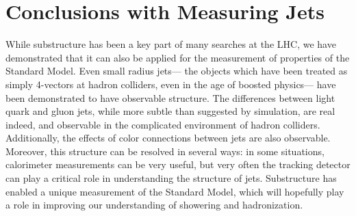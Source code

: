 


\section{Conclusions with Measuring Jets}

While substructure has been a key part of many searches at the LHC, we have demonstrated that it can also be applied for the measurement of properties of the Standard Model. Even small radius jets--- the objects which have been treated as simply 4-vectors at hadron colliders, even in the age of boosted physics--- have been demonstrated to have observable structure. The differences between light quark and gluon jets, while more subtle than suggested by simulation, are real indeed, and observable in the complicated environment of hadron colliders. Additionally, the effects of color connections between jets are also observable. Moreover, this structure can be resolved in several ways: in some situations, calorimeter measurements can be very useful, but very often the tracking detector can play a critical role in understanding the structure of jets. Substructure has enabled a unique measurement of the Standard Model, which will hopefully play a role in improving our understanding of showering and hadronization.
